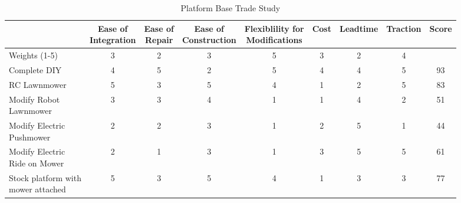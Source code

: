 \documentclass{article}
\begin{document}
		\begin{table}[H]
		\begin{adjustwidth}{-1.5in}{-1.5in}
		\centering
		\setlength{\dashlinedash}{.4pt}

		\begin{tabular}{|l|c|c|c|c|c|c|c|c|}
		\hline
		            & \makecell{Ease of \\ Integration} & \makecell{Ease of \\ Repair} & \makecell{Ease of \\ Construction} & \makecell{Flexiblility for \\ Modifications} & Cost & Leadtime & Traction & Score \\ \hline
		Weights (1-5)                      & 3                   & 2              & 3                    & 5                              & 3    & 2        & 4        &       \\ \hline
		\multicolumn{1}{|l|}{\cellcolor{highlight}Complete DIY} & \multicolumn{1}{c|}{\cellcolor{highlight}4}                   & \multicolumn{1}{c|}{\cellcolor{highlight}5}              & \multicolumn{1}{c|}{\cellcolor{highlight}2}                    & \multicolumn{1}{c|}{\cellcolor{highlight}5}                              & \multicolumn{1}{c|}{\cellcolor{highlight}4}    & \multicolumn{1}{c|}{\cellcolor{highlight}4}        & \multicolumn{1}{c|}{\cellcolor{highlight}5}        & \multicolumn{1}{c|}{\cellcolor{highlight}93}    \\ \hdashline
		RC Lawnmower                       & 5                   & 3              & 5                    & 4                              & 1    & 2        & 5        & 83    \\ \hdashline
		\makecell[l]{Modify Robot \\ Lawnmower}           & 3                   & 3              & 4                    & 1                              & 1    & 4        & 2        & 51    \\ \hdashline
		\makecell[l]{Modify Electric \\ Pushmower}         & 2                   & 2              & 3                    & 1                              & 2    & 5        & 1        & 44    \\ \hdashline
		\makecell[l]{Modify Electric \\ Ride on Mower}      & 2                   & 1              & 3                    & 1                              & 3    & 5        & 5        & 61    \\ \hdashline
		\makecell[l]{Stock platform with \\ mower attached} & 5                   & 3              & 5                    & 4                              & 1    & 3        & 3        & 77    \\ \hline
		\end{tabular}
		\caption{Platform Base Trade Study}
		\label{my-label}
		\end{adjustwidth}
		\end{table}
		
\end{document}
